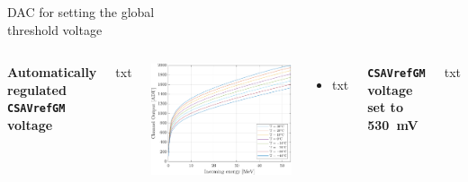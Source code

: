 \documentclass[aspectratio=169,xcolor=dvipsnames]{beamer}
\begin{document}
\begin{frame}{DAC for setting the global\\ \vskip-0.15cm threshold voltage}
\fontsize{8.5pt}{1}\selectfont
    \begin{columns}[T]
        \addtolength{\leftmargini}{\labelsep}
        \vskip0.3cm
        \textbf{Automatically regulated \texttt{CSAVrefGM} voltage}\\
        \vskip0.15cm
    
        txt

        \vskip-0.4cm
        \begin{center}
            \includegraphics[height=0.48\textheight]{images/temperature_effects/fdt_csavrefgm_auto_tau6_keV_0011.pdf}
        \end{center}

        \vskip-0.2cm
        \begin{itemize}
            \item txt
        \end{itemize}

            \addtolength{\leftmargini}{\labelsep}
            \vskip0.3cm
            \textbf{\texttt{CSAVrefGM} voltage set to \SI{530}{\milli\volt}}\\
            \vskip0.15cm
        
            txt
    

\end{columns}
\end{frame}
\end{document}
